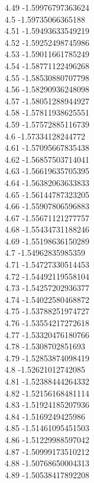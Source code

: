 {4.49	-1.59976797363624\\
4.5	-1.59735066365188\\
4.51	-1.59493633549219\\
4.52	-1.59252498745986\\
4.53	-1.59011661785249\\
4.54	-1.58771122496268\\
4.55	-1.58530880707798\\
4.56	-1.58290936248098\\
4.57	-1.58051288944927\\
4.58	-1.57811938625551\\
4.59	-1.57572885116739\\
4.6	-1.57334128244772\\
4.61	-1.57095667835438\\
4.62	-1.56857503714041\\
4.63	-1.56619635705395\\
4.64	-1.56382063633833\\
4.65	-1.56144787323205\\
4.66	-1.55907806596883\\
4.67	-1.55671121277757\\
4.68	-1.55434731188246\\
4.69	-1.55198636150289\\
4.7	-1.54962835985359\\
4.71	-1.54727330514453\\
4.72	-1.54492119558104\\
4.73	-1.54257202936377\\
4.74	-1.54022580468872\\
4.75	-1.53788251974727\\
4.76	-1.53554217272618\\
4.77	-1.53320476180766\\
4.78	-1.5308702851693\\
4.79	-1.52853874098419\\
4.8	-1.52621012742085\\
4.81	-1.52388444264332\\
4.82	-1.52156168481114\\
4.83	-1.51924185207936\\
4.84	-1.5169249425986\\
4.85	-1.51461095451503\\
4.86	-1.51229988597042\\
4.87	-1.50999173510212\\
4.88	-1.50768650004313\\
4.89	-1.50538417892208\\
}
